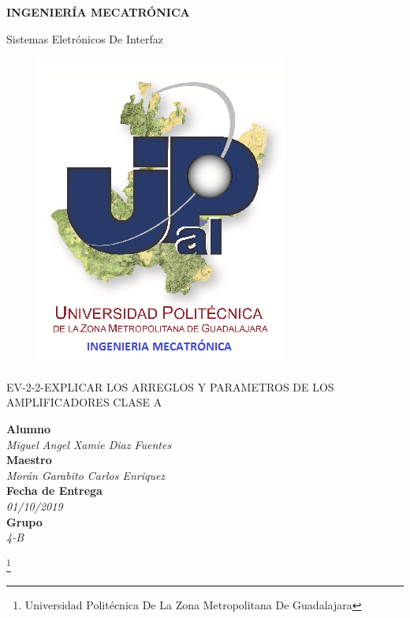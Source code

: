 \documentclass[11pt,a4paper]{article}
\author{Miguel Angel Xamie Diaz Fuentes}
\begin{document}
\begin{center}
\begin{LARGE}
\textbf{INGENIERÍA MECATRÓNICA}\\
\end{LARGE}
{\large Sistemas Eletrónicos De Interfaz}\\
\begin{figure}[hbtp]
\centering
\includegraphics[scale=0.80]{UPZMG_Mecatr_nica.png}
\end{figure} 
\begin{center}
\begin{LARGE}
EV-2-2-EXPLICAR LOS ARREGLOS Y PARAMETROS DE LOS AMPLIFICADORES CLASE A
\end{LARGE}
\end{center}

\begin{Large}
\textbf{Alumno}
\\\textit{Miguel Angel Xamie Diaz Fuentes}
\textbf{\\Maestro}
\\\textit{Morán Garabito Carlos Enriquez}
\textbf{\\Fecha de Entrega}
\\\textit{01/10/2019}
\textbf{\\Grupo}
\\\textit{4-B}
\end{Large}

\end{center}

\footnote{Universidad Politécnica De La Zona Metropolitana De Guadalajara} 
\end{document}
